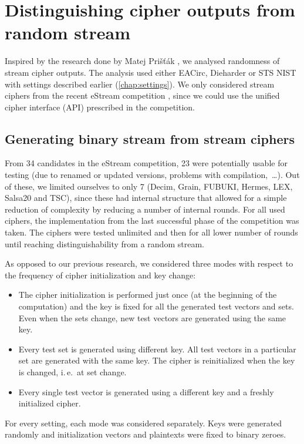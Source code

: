 \documentclass[12pt,oneside]{fithesis2}
\newcommand{\squarebullet}{\textcolor{black}{\raisebox{0.15em}{\rule{4pt}{4pt}}}}
\newenvironment{myItemize}{
  \begin{itemize}[leftmargin=2em,rightmargin=1em,itemsep=\parskip ,parsep=0em,topsep=0em,partopsep=0em]
  \renewcommand{\labelitemi}{\squarebullet}
  \renewcommand{\labelitemii}{$\diamond$}
}{
  \end{itemize}
}
\begin{document}
\chapter{Distinguishing cipher outputs from random stream}
\label{chap:distinguish-cipher}

Inspired by the research done by Matej Prišťák \parencite{thesis-pristak}, we analysed randomness of stream cipher outputs.
The analysis used either EACirc, Dieharder or STS NIST with settings described earlier (\autoref{chap:settings}).
We only considered stream ciphers from the recent eStream competition \parencite{estream-competition},
since we could use the unified cipher interface (API) prescribed in the competition.

\section{Generating binary stream from stream ciphers}
\label{sec:estream-settings}

From 34 candidates in the eStream competition, 23 were potentially usable for testing (due to renamed or updated versions, 
problems with compilation,~\dots). Out of these, we limited ourselves to only 7 (Decim, Grain, FUBUKI, Hermes, LEX, Salsa20 and TSC),
since these had internal structure that allowed for a simple reduction of complexity by reducing a number of internal rounds.
For all used ciphers, the implementation from the last successful phase of the competition was taken. 
The ciphers were tested unlimited and then for all lower number of rounds until reaching distinguishability from a random stream.

As opposed to our previous research, we considered three modes with respect to the frequency of cipher initialization and key change:
\begin{myItemize}
\item The cipher initialization is performed just once (at the beginning of the computation) and the key is fixed for
all the generated test vectors and sets. Even when the sets change, new test vectors are generated using the same key.
\item Every test set is generated using different key. All test vectors in a particular set are generated with the same key.
The cipher is reinitialized when the key is changed, i.\,e.\ at set change.
\item Every single test vector is generated using a different key and a freshly initialized cipher.
\end{myItemize}
For every setting, each mode was considered separately. Keys were generated randomly and initialization vectors and plaintexts
were fixed to binary zeroes.
\end{document}
